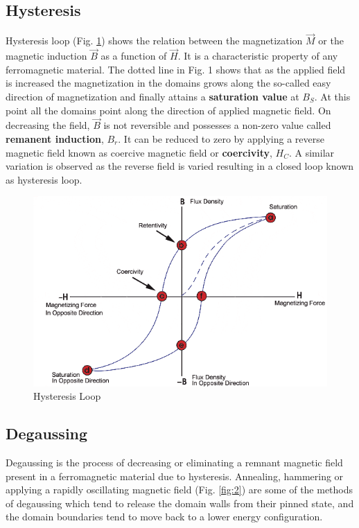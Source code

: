 \subsection*{Hysteresis}
Hysteresis loop (Fig. \ref{fig:1}) shows the relation between the magnetization $\vec{M}$ or the magnetic induction $\vec{B}$ as a function of $\vec{H}$. It is a characteristic property of any ferromagnetic material. The dotted line in Fig. 1 shows that as the applied field is increased the magnetization in the domains grows along the so-called easy direction of magnetization and finally attains a \textbf{saturation value} at $B_S$. At this point all the domains point along the direction of applied magnetic field. On decreasing the field, $\vec{B}$ is not reversible and possesses a non-zero value called \textbf{remanent induction}, $B_r$. It can be reduced to zero by applying a reverse magnetic field known as coercive magnetic field or \textbf{coercivity}, $H_C$. A similar variation is observed as the reverse field is varied resulting in a closed loop known as hysteresis loop.


\begin{figure}[H]
    \centering
    \includegraphics[width=1\columnwidth]{images/f1.png}
    \caption{Hysteresis Loop}
    \label{fig:1}
\end{figure}

\subsection*{Degaussing}
Degaussing is the process of decreasing or eliminating a remnant magnetic field present in a ferromagnetic material due to hysteresis. Annealing, hammering or applying a rapidly oscillating magnetic field (Fig. \ref{fig:2}) are some of the methods of degaussing which tend to release the domain walls from their pinned state, and the domain boundaries tend to move back to a lower energy configuration. 


